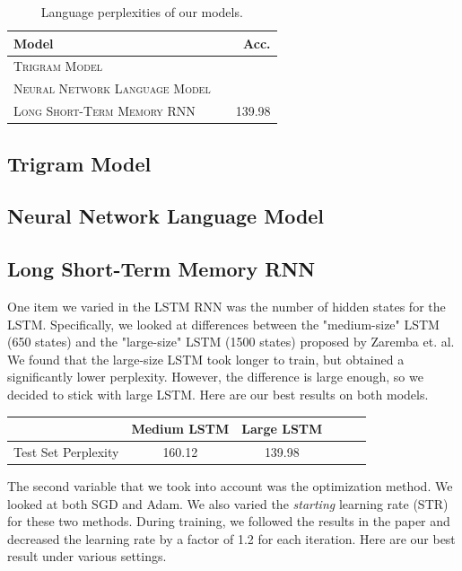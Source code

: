 \documentclass[11pt]{article}
\begin{document}
\begin{table}[H]
\centering
\begin{tabular}{llr}
 \toprule
 Model &  & Acc. \\
 \midrule
 \textsc{Trigram Model} & &  \\
 \textsc{Neural Network Language Model} & &  \\
 \textsc{Long Short-Term Memory RNN} & & 139.98 \\
 \bottomrule 
\end{tabular}
\caption{\label{tab:results} Language perplexities of our models.}
\end{table}

\subsection{Trigram Model} 

\subsection{Neural Network Language Model}

\subsection{Long Short-Term Memory RNN}
One item we varied in the LSTM RNN was the number of hidden states for the LSTM.  Specifically, we looked at differences between the "medium-size" LSTM (650 states) and the "large-size" LSTM (1500 states) proposed by Zaremba et. al.  We found that the large-size LSTM took longer to train, but obtained a significantly lower perplexity.  However, the difference is large enough, so we decided to stick with large LSTM.  Here are our best results on both models.

\begin{center}
	\begin{tabular}{ c | c c c c c}
		 & Medium LSTM & Large LSTM  \\
		\hline
		Test Set Perplexity & 160.12 & 139.98 
	\end{tabular}
\end{center} 

The second variable that we took into account was the optimization method.  We looked at both SGD and Adam.  We also varied the \emph{starting} learning rate (STR) for these two methods.  During training, we followed the results in the paper and decreased the learning rate by a factor of 1.2 for each iteration.  Here are our best result under various settings.     
\end{document}
